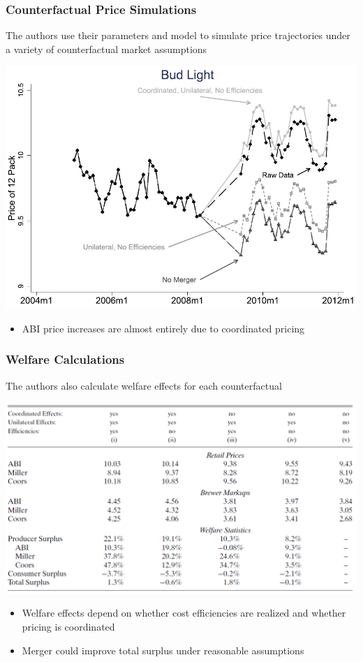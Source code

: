 \documentclass{beamer}
\begin{document}
\begin{frame}\frametitle{Counterfactual Price Simulations}
    The authors use their parameters and model to simulate price trajectories under a variety of counterfactual market assumptions
    \begin{center}
        \includegraphics[width=0.7\linewidth]{fig_5}
    \end{center}
    \begin{itemize}
        \item ABI price increases are almost entirely due to coordinated pricing
    \end{itemize}
\end{frame}

\begin{frame}\frametitle{Welfare Calculations}
    The authors also calculate welfare effects for each counterfactual
    \begin{center}
        \includegraphics[width=0.85\linewidth]{table_10}
    \end{center}
    \begin{itemize}
        \item Welfare effects depend on whether cost efficiencies are realized and whether pricing is coordinated
        \item Merger could improve total surplus under reasonable assumptions
    \end{itemize}
\end{frame}
\end{document}

